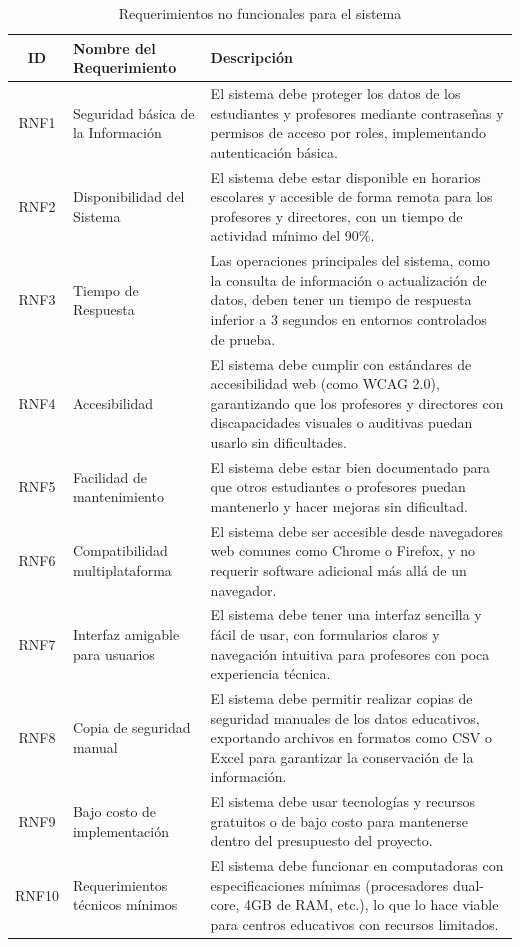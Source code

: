 \begin{table}[htbp]
\centering
\begin{tabular}{|c|l|p{10cm}|}
\hline
\textbf{ID} & \textbf{Nombre del Requerimiento} & \textbf{Descripción} \\ \hline
RNF1 & Seguridad básica de la Información & El sistema debe proteger los datos de los estudiantes y profesores mediante contraseñas y permisos de acceso por roles, implementando autenticación básica. \\ \hline
RNF2 & Disponibilidad del Sistema & El sistema debe estar disponible en horarios escolares y accesible de forma remota para los profesores y directores, con un tiempo de actividad mínimo del 90\%. \\ \hline
RNF3 & Tiempo de Respuesta & Las operaciones principales del sistema, como la consulta de información o actualización de datos, deben tener un tiempo de respuesta inferior a 3 segundos en entornos controlados de prueba. \\ \hline
RNF4 & Accesibilidad & El sistema debe cumplir con estándares de accesibilidad web (como WCAG 2.0), garantizando que los profesores y directores con discapacidades visuales o auditivas puedan usarlo sin dificultades. \\ \hline
RNF5 & Facilidad de mantenimiento & El sistema debe estar bien documentado para que otros estudiantes o profesores puedan mantenerlo y hacer mejoras sin dificultad. \\ \hline
RNF6 & Compatibilidad multiplataforma & El sistema debe ser accesible desde navegadores web comunes como Chrome o Firefox, y no requerir software adicional más allá de un navegador. \\ \hline
RNF7 & Interfaz amigable para usuarios & El sistema debe tener una interfaz sencilla y fácil de usar, con formularios claros y navegación intuitiva para profesores con poca experiencia técnica. \\ \hline
RNF8 & Copia de seguridad manual & El sistema debe permitir realizar copias de seguridad manuales de los datos educativos, exportando archivos en formatos como CSV o Excel para garantizar la conservación de la información. \\ \hline
RNF9 & Bajo costo de implementación & El sistema debe usar tecnologías y recursos gratuitos o de bajo costo para mantenerse dentro del presupuesto del proyecto. \\ \hline
RNF10 & Requerimientos técnicos mínimos & El sistema debe funcionar en computadoras con especificaciones mínimas (procesadores dual-core, 4GB de RAM, etc.), lo que lo hace viable para centros educativos con recursos limitados. \\ \hline
\end{tabular}
\caption{Requerimientos no funcionales para el sistema}
\end{table}

